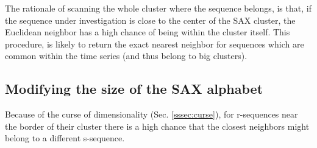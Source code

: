 \documentclass[a4paper,twoside]{article}
\begin{document}
%
%
%
The rationale of scanning the whole cluster where the sequence belongs, is that, if the sequence under investigation is close to the center of the SAX cluster, the Euclidean neighbor has a high chance of being within the cluster itself.
%
This procedure, is likely to return the exact nearest neighbor for sequences which are common within the time series (and thus belong to big clusters). 


\subsection{Modifying the size of the SAX alphabet}\label{ssec:sizeAlphabet}
Because of the curse of dimensionality (Sec. \ref{sssec:curse}), for r-sequences near the border of their cluster there is a high chance that the closest neighbors might belong to a different s-sequence.  
%
\end{document}
